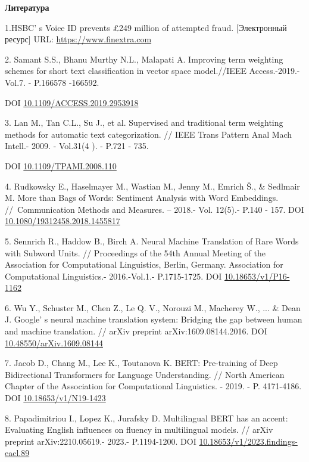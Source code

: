 \begin{center}
{\bfseries Литература}
\end{center}

1.HSBC' s Voice ID prevents £249 million of attempted
fraud. {[}Электронный ресурс{]} URL:
\href{https://www.finextra.com/newsarticle/37989/hsbcs-voice-id-prevents-249-million-of-attempted-fraud}{https://www.finextra.com}

2. Samant S.S., Bhanu Murthy N.L., Malapati A. Improving term weighting
schemes for short text classification in vector space model.//IEEE
Access.-2019.- Vol.7. - P.166578 -166592.

DOI
\href{https://doi.org/10.1109/ACCESS.2019.2953918}{10.1109/ACCESS.2019.2953918}

3. Lan M., Tan C.L., Su J., et al. Supervised and traditional term
weighting methods for automatic text categorization. // IEEE Trans
Pattern Anal Mach Intell.- 2009. - Vol.31(4 ). - P.721 - 735.

DOI
\href{https://doi.org/10.1109/tpami.2008.110}{10.1109/TPAMI.2008.110}

4. Rudkowsky E., Haselmayer M., Wastian M., Jenny M., Emrich Š., \&
Sedlmair M. More than Bags of Words: Sentiment Analysis with Word
Embeddings. //~Communication Methods and Measures. -- 2018.- Vol.
12(5).- P.140 - 157. DOI
\href{http://dx.doi.org/10.1080/19312458.2018.1455817}{10.1080/19312458.2018.1455817}

5. Sennrich R., Haddow B., Birch A. Neural Machine Translation of Rare
Words with Subword Units. // Proceedings of the 54th Annual Meeting of
the Association for Computational Linguistics, Berlin, Germany.
Association for Computational Linguistics.- 2016.-Vol.1.- P.1715-1725.
DOI \href{https://doi.org/10.18653/v1/P16-1162}{10.18653/v1/P16-1162}

6. Wu Y., Schuster M., Chen Z., Le Q. V., Norouzi M., Macherey W., ...
\& Dean J. Google' s neural machine translation system:
Bridging the gap between human and machine translation. // arXiv
preprint arXiv:1609.08144.2016. DOI
\href{http://dx.doi.org/10.48550/arXiv.1609.08144}{10.48550/arXiv.1609.08144}

7. Jacob D., Chang M., Lee K., Toutanova K. BERT: Pre-training of Deep
Bidirectional Transformers for Language Understanding. // North American
Chapter of the Association for Computational Linguistics. - 2019. - P.
4171-4186. DOI
\href{https://doi.org/10.18653/v1/N19-1423}{10.18653/v1/N19-1423}

8. Papadimitriou I., Lopez K., Jurafsky D. Multilingual BERT has an
accent: Evaluating English influences on fluency in multilingual models.
// arXiv preprint arXiv:2210.05619.- 2023.- P.1194-1200. DOI
\href{https://doi.org/10.18653/v1/2023.findings-eacl.89}{10.18653/v1/2023.findings-eacl.89}

